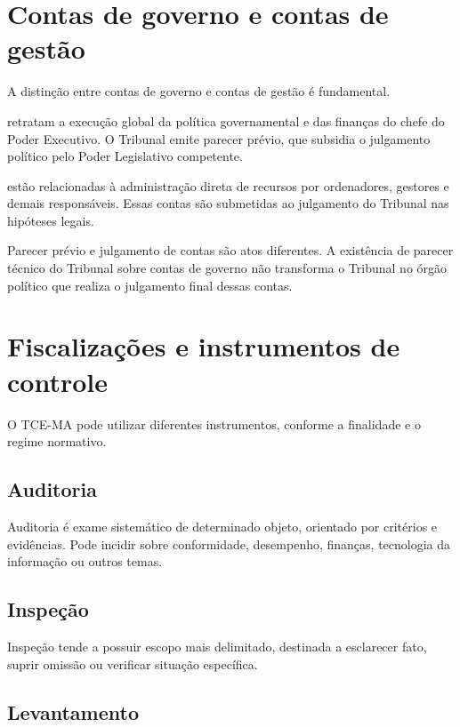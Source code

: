 \section{Contas de governo e contas de gestão}

A distinção entre contas de governo e contas de gestão é fundamental.

 retratam a execução global da política governamental e das finanças do chefe do Poder Executivo. O Tribunal emite parecer prévio, que subsidia o julgamento político pelo Poder Legislativo competente.

 estão relacionadas à administração direta de recursos por ordenadores, gestores e demais responsáveis. Essas contas são submetidas ao julgamento do Tribunal nas hipóteses legais.

\begin{atencao}
Parecer prévio e julgamento de contas são atos diferentes. A existência de parecer técnico do Tribunal sobre contas de governo não transforma o Tribunal no órgão político que realiza o julgamento final dessas contas.
\end{atencao}

\section{Fiscalizações e instrumentos de controle}

O TCE-MA pode utilizar diferentes instrumentos, conforme a finalidade e o regime normativo.

\subsection{Auditoria}

Auditoria é exame sistemático de determinado objeto, orientado por critérios e evidências. Pode incidir sobre conformidade, desempenho, finanças, tecnologia da informação ou outros temas.

\subsection{Inspeção}

Inspeção tende a possuir escopo mais delimitado, destinada a esclarecer fato, suprir omissão ou verificar situação específica.

\subsection{Levantamento}

